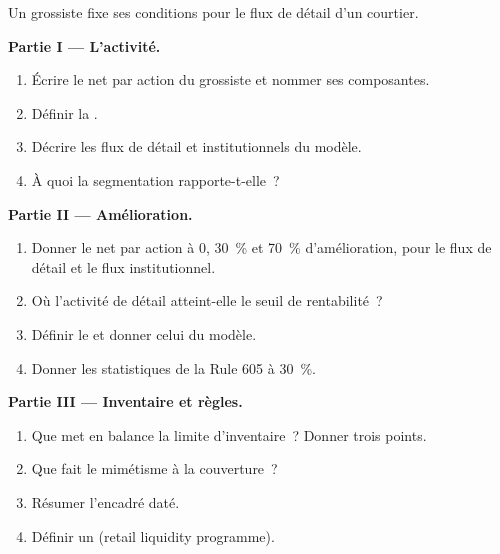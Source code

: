 \begin{problem}\label{pb:hf:retail-wholesaling:1}
Un grossiste fixe ses conditions pour le flux de détail d'un courtier.

\medskip\noindent\textbf{Partie I --- L'activité.}
\begin{enumerate}
\item Écrire le net par action du grossiste et nommer ses composantes.
\item Définir la .
\item Décrire les flux de détail et institutionnels du modèle.
\item À quoi la segmentation rapporte-t-elle~?
\end{enumerate}

\medskip\noindent\textbf{Partie II --- Amélioration.}
\begin{enumerate}[resume]
\item Donner le net par action à 0, 30~\% et 70~\% d'amélioration, pour le flux de détail et le flux institutionnel.
\item Où l'activité de détail atteint-elle le seuil de rentabilité~?
\item Définir le  et donner celui du modèle.
\item Donner les statistiques de la Rule 605 à 30~\%.
\end{enumerate}

\medskip\noindent\textbf{Partie III --- Inventaire et règles.}
\begin{enumerate}[resume]
\item Que met en balance la limite d'inventaire~? Donner trois points.
\item Que fait le mimétisme à la couverture~?
\item Résumer l'encadré daté.
\item Définir un  (retail liquidity programme).
\end{enumerate}


\end{problem}
